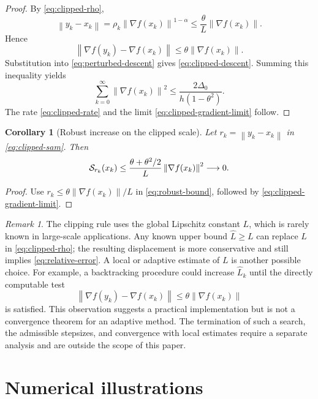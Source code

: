\documentclass[11pt]{article}
\newtheorem{corollary}[theorem]{Corollary}
\theoremstyle{remark}
\newtheorem{remark}[theorem]{Remark}
\newcommand{\norm}[1]{\left\lVert #1\right\rVert}
\begin{document}
\begin{proof}
By \eqref{eq:clipped-rho},
$$
 \norm{y_k-x_k}
 =\rho_k\norm{\nabla f(x_k)}^{1-\alpha}
 \leq\frac{\theta}{L}\norm{\nabla f(x_k)}.
$$
Hence
$$
 \norm{\nabla f(y_k)-\nabla f(x_k)}
 \leq\theta\norm{\nabla f(x_k)}.
$$
Substitution into \eqref{eq:perturbed-descent} gives
\eqref{eq:clipped-descent}.  Summing this inequality yields
$$
 \sum_{k=0}^{\infty}\norm{\nabla f(x_k)}^2
 \leq\frac{2\Delta_0}{h(1-\theta^2)}.
$$
The rate \eqref{eq:clipped-rate} and the limit
\eqref{eq:clipped-gradient-limit} follow.
\end{proof}

\begin{corollary}[Robust increase on the clipped scale]
\label{cor:clipped-sharpness}
Let $r_k=\norm{y_k-x_k}$ in \eqref{eq:clipped-sam}.  Then
\begin{equation}\label{eq:clipped-sharpness}
 {\cal S}_{r_k}(x_k)
 \leq
 \frac{\theta+\theta^2/2}{L}
 \norm{\nabla f(x_k)}^2
 \longrightarrow0.
\end{equation}
\end{corollary}

\begin{proof}
Use $r_k\leq\theta\norm{\nabla f(x_k)}/L$ in
\eqref{eq:robust-bound}, followed by
\eqref{eq:clipped-gradient-limit}.
\end{proof}

\begin{remark}
The clipping rule uses the global Lipschitz constant $L$, which is rarely
known in large-scale applications.  Any known upper bound
$\widehat L\geq L$ can replace $L$ in \eqref{eq:clipped-rho}; the
resulting displacement is more conservative and still implies
\eqref{eq:relative-error}.  A local or adaptive estimate of $L$ is another
possible choice.  For example, a backtracking procedure could increase
$\widehat L_k$ until the directly computable test
$$
 \norm{\nabla f(y_k)-\nabla f(x_k)}
 \leq\theta\norm{\nabla f(x_k)}
$$
is satisfied.  This observation suggests a practical implementation but is
not a convergence theorem for an adaptive method.  The termination of such a
search, the admissible stepsizes, and convergence with local estimates
require a separate analysis and are outside the scope of this paper.
\end{remark}

\section{Numerical illustrations}\label{sec5}
\end{document}

